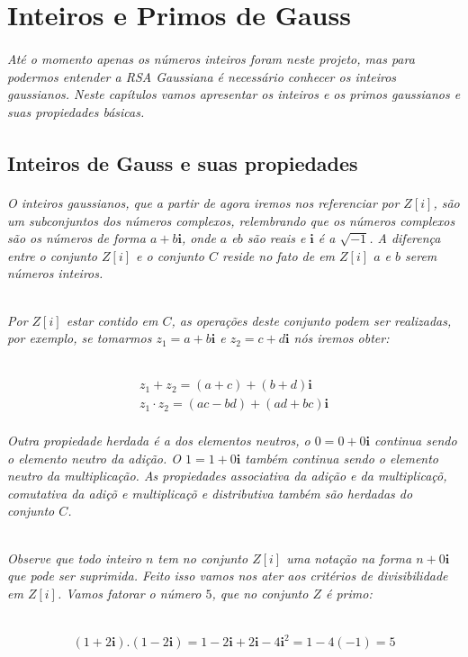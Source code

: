 \chapter {Inteiros e Primos de Gauss}
\label{IG}

\subparagraph{
At\'e o momento apenas os n\'umeros inteiros foram neste projeto, mas para podermos entender a RSA Gaussiana \'e necess\'ario conhecer os inteiros gaussianos. Neste cap\'itulos vamos apresentar os inteiros e os primos gaussianos e suas propiedades b\'asicas. 
}

\section{Inteiros de Gauss e suas propiedades}

\subparagraph{
O inteiros gaussianos, que a partir de agora iremos nos referenciar por $Z[i]$, s\~ao um subconjuntos dos n\'umeros complexos, relembrando que os n\'umeros complexos s\~ao os n\'umeros de forma $a+b\textbf{i}$, onde $a$ e$b$ s\~ao reais e $\textbf{i}$ \'e a $\sqrt{-1}$. A diferen\c{c}a entre o conjunto $Z[i]$ e o conjunto $C$ reside no fato de em $Z[i]$ $a$ e $b$ serem n\'umeros inteiros.
}
\subparagraph{
Por $Z[i]$ estar contido em $C$, as opera\c{c}\~oes deste conjunto podem ser realizadas, por exemplo, se tomarmos $z_1= a + b\textbf{i}$ e $z_2= c + d\textbf{i}$ n\'os iremos obter:
}
\[
	\begin{array}{c}
		\textit{$z_1   +   z_2 = (a + c) + (b + d)\textbf{i}$}\\
		\textit{$z_1 \cdot z_2 = (ac - bd) + (ad + bc)\textbf{i}$}
	\end{array}
\]
\subparagraph{
Outra propiedade herdada \'e a dos elementos neutros, o $0 = 0 + 0\textbf{i}$ continua sendo o elemento neutro da adi\c{c}\~ao. O $1 = 1 + 0\textbf{i}$ tamb\'em continua sendo o elemento neutro da multiplica\c{c}\~ao. As propiedades associativa da adi\c{c}\~ao e da multiplica\c{c}\~o, comutativa da adi\c{c}\~o e multiplica\c{c}\~o e distributiva tamb\'em s\~ao herdadas do conjunto $C$.
}
\subparagraph{
Observe que todo inteiro $n$ tem no conjunto $Z[i]$ uma nota\c{c}\~ao na forma $n + 0 \textbf{i}$ que pode ser suprimida. Feito isso vamos nos ater aos crit\'erios de divisibilidade em $Z[i]$. Vamos fatorar o n\'umero $5$, que no conjunto $Z$ \'e primo:
}
\[
	\begin{array}{c}
		\textit{$(1 + 2\textbf{i}).(1 - 2\textbf{i}) = 1 - 2\textbf{i} + 2\textbf{i} - 4\textbf{i}^2 = 1 - 4(-1) = 5$}\\
	\end{array}
\]
